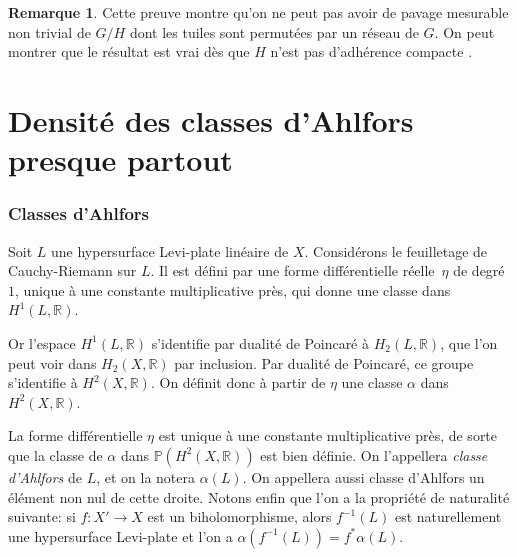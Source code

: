 \documentclass[JEP,XML,SOM,Unicode,francais,published]{cedram}
\newcommand{\R}{\mathbb{R}}
\theoremstyle{definition}
\newtheorem{rem}[thm]{Remarque}
\begin{document}
\begin{rem}
Cette preuve montre qu'on ne peut pas avoir de pavage mesurable non trivial de $G/H$ dont les tuiles sont permutées par un réseau de $G$. On peut montrer que le résultat est vrai dès que $H$ n'est pas d'adhérence compacte \cite{note-pavage}.\end{rem}
\section{Densité des classes d'Ahlfors presque partout}
\label{section:ahlfors}
\subsubsection*{Classes d'Ahlfors}
Soit $L$ une hypersurface Levi-plate linéaire de $X$. Considérons le feuilletage de Cauchy-Riemann sur $L$. Il est défini par une forme différentielle réelle~$\eta$ de degré $1$, unique à une constante multiplicative près, qui donne une classe dans $H^1(L, \R)$.

Or l'espace $H^1(L, \R)$ s'identifie par dualité de Poincaré à $H_2(L, \R)$, que l'on peut voir dans $H_2(X, \R)$ par inclusion. Par dualité de Poincaré, ce groupe s'identifie à $H^2(X, \R)$. On définit donc à partir de $\eta$ une classe $\alpha$ dans $H^2(X, \R)$.

La forme différentielle $\eta$ est unique à une constante multiplicative près, de sorte que la classe de $\alpha$ dans $\mathbb{P}(H^2(X, \R))$ est bien définie. On l'appellera \emph{classe d'Ahlfors} de $L$, et on la notera $\alpha(L)$. On appellera aussi classe d'Ahlfors un élément non nul de cette droite.
Notons enfin que l'on a la propriété de naturalité suivante: si $f \colon X' \to X$ est un biholomorphisme, alors $f^{-1}(L)$ est naturellement une hypersurface Levi-plate et l'on a $\alpha(f^{-1}(L)) = f^{*}\alpha(L)$.
\end{document}
